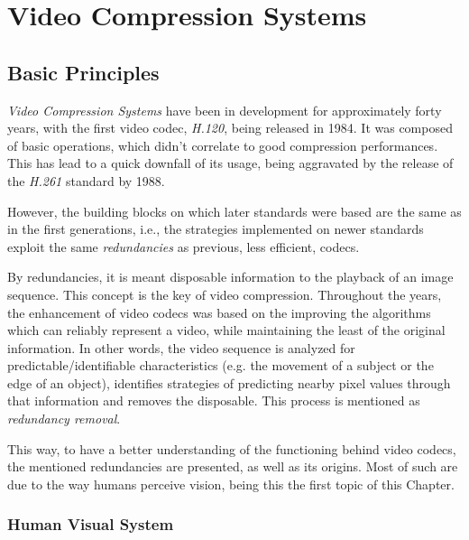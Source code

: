 \cleardoublepage
\chapter{Video Compression Systems}\label{chap:av1}

\section{Basic Principles}

\emph{Video Compression Systems} have been in development for approximately forty years, with the first video codec, \emph{H.120}, being released in 1984. It was composed of basic operations, which didn't correlate to good compression performances. This has lead to a quick downfall of its usage, being aggravated by the release of the \emph{H.261} standard by 1988.

However, the building blocks on which later standards were based are the same as in the first generations, i.e., the strategies implemented on newer standards exploit the same \emph{redundancies} as previous, less efficient, codecs.

By redundancies, it is meant disposable information to the playback of an image sequence. This concept is the key of video compression. Throughout the years, the enhancement of video codecs was based on the improving the algorithms which can reliably represent a video, while maintaining the least of the original information. In other words, the video sequence is analyzed for predictable/identifiable characteristics (e.g. the movement of a subject or the edge of an object), identifies strategies of predicting nearby pixel values through that information and removes the disposable. This process is mentioned as \emph{redundancy removal}.

This way, to have a better understanding of the functioning behind video codecs, the mentioned redundancies are presented, as well as its origins. Most of such are due to the way humans perceive vision, being this the first topic of this Chapter.

\subsection{Human Visual System} \label{ssec:hvs}


